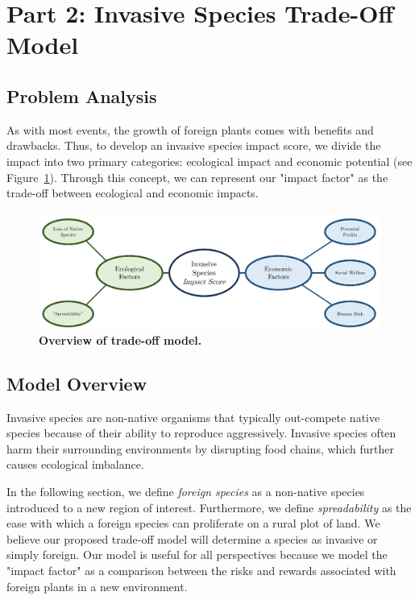 \section{Part 2: Invasive Species Trade-Off Model}

\subsection{Problem Analysis}
As with most events, the growth of foreign plants comes with benefits and drawbacks. Thus, to develop an invasive species impact score, we divide the impact into two primary categories: ecological impact and economic potential (see Figure~\ref{fig:invasiveimpactbrainstorm}). Through this concept, we can represent our "impact factor" as the trade-off between ecological and economic impacts. 

\begin{figure}[h!]
\centering
    \includegraphics[scale=0.5]{figures/invasivespeciesimpactscore.pdf}
    \captionsetup{width=0.9\textwidth}
    \caption{\textbf{Overview of trade-off model.}}
    \label{fig:invasiveimpactbrainstorm}
\end{figure}

\subsection{Model Overview}

Invasive species are non-native organisms that typically out-compete native species because of their ability to reproduce aggressively. Invasive species often harm their surrounding environments by disrupting food chains, which further causes ecological imbalance. 

In the following section, we define \textit{foreign species} as a non-native species introduced to a new region of interest. Furthermore, we define \textit{spreadability} as the ease with which a foreign species can proliferate on a rural plot of land. We believe our proposed trade-off model will determine a species as invasive or simply foreign. Our model is useful for all perspectives because we model the "impact factor" as a comparison between the risks and rewards associated with foreign plants in a new environment. 



